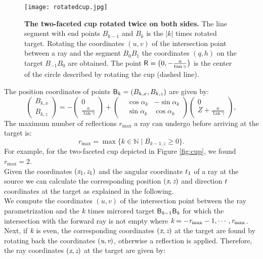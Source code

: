 \begin{figure}[t]%
 \begin{center}
  \texttt{[image: rotatedcup.jpg]}
  \end{center}
 \caption{\textbf{The two-faceted cup rotated twice on both sides.} The line segment with end points $B_{k-1}$ and $B_{k}$ is the $|k|$ times rotated target. Rotating the coordinates $(u,v)$ of the intersection point between a ray and the segment $B_0B_1$ the coordinates $(q,h)$ on the target $B_{-1}B_{0}$ are obtained. The point $\textsf{R} = \big(0,-\frac{a}{\tan{\gamma}}\big)$ is the center of the circle described by rotating the cup (dashed line).}
  \label{fig:twofaced}
  \end{figure}
The position coordinates of points $\textsf{B}_k = (B_{k,x}, B_{k,z})$ are given by:
\begin{equation}
 \begin{pmatrix} B_{k,x}  \\  B_{k,z}\end{pmatrix}= -
  \begin{pmatrix} 0  \\  \frac{a}{\tan\gamma}\end{pmatrix}+
 \left(\begin{split}  & \cos\alpha_k  & -\sin\alpha_k \\  & \sin\alpha_k & \cos\alpha_k\end{split}\right)
 \begin{pmatrix}  0 \\  Z+\frac{a}{\tan\gamma}\end{pmatrix},
\end{equation}
The maximum number of reflections $r_{\textrm{max}}$ a ray can undergo before arriving at the target is:
\begin{equation}
r_{\textrm{max}}=\max\{k\in\mathbb{N} \;| \; B_{k-1,z}\geq 0\}.
\end{equation}
For example, for the two-faceted cup depicted in Figure \ref{fig:cup}, we found $r_{\textrm{max}}=2$.\\ \indent 
Given the coordinates $(\textit{x}_1, \textit{z}_1)$ and the angular coordinate $t_1$ of a ray at the source we can calculate the corresponding position $(\textit{x}, \textit{z})$ and direction $t$ coordinates at the target as explained in the following. \\ \indent We compute the coordinates $(u,v)$ of the intersection point between the ray parametrization and the $\textit{k}$ times mirrored target $\textsf{B}_{\textit{k}-1}\textsf{B}_{\textit{k}}$ for which the intersection with the forward ray is not empty where $\textit{k}=-\textit{r}_{\textrm{max}}-1, \cdots, \textit{r}_{\textrm{max}}$. Next, if $\textit{k}$ is even, the corresponding coordinates $(\textit{x},\textit{z})$ at the target are found by rotating back the coordinates $(\textit{u},\textit{v})$, otherwise a reflection is applied. Therefore, the ray coordinates $(\textit{x},\textit{z})$ at the target are given by:
